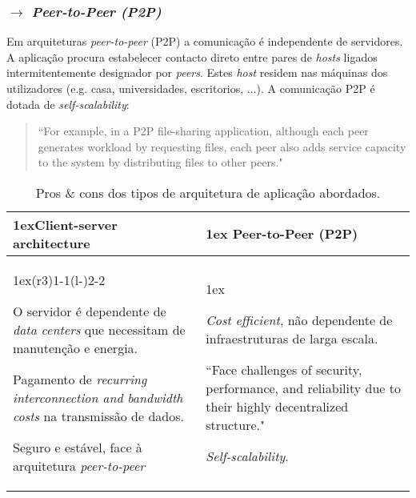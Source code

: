 \subsubsection[2.1.2 Peer-to-Peer (P2P)]{$\pmb{\rightarrow}$ \textit{Peer-to-Peer (P2P)}}

Em arquiteturas \textit{peer-to-peer} (P2P) a comunicação é independente de servidores. A aplicação procura estabelecer contacto direto entre pares de \textit{hosts} ligados intermitentemente designador por \textit{peers}. Estes \textit{host} residem nas máquinas dos utilizadores (e.g. casa, universidades, escritorios, ...). A comunicação P2P é dotada de \textit{self-scalability}:

\begin{quote}
    ``For example, in a P2P file-sharing application, although each peer generates workload by requesting files, each peer also adds service capacity to the system by distributing files to other peers."\cite{Kurose2017}
\end{quote}

\vspace{-0.5 em}
\begin{table}[H]
    \begin{tabularx}{\linewidth}{>{\parskip1ex}X@{\kern4\tabcolsep}>{\parskip1ex}X}
    \toprule
    \hfil\bfseries Client-server architecture
    &
    \hfil\bfseries Peer-to-Peer (P2P) 
    \\\cmidrule(r{3\tabcolsep}){1-1}\cmidrule(l{-\tabcolsep}){2-2}
    
    O servidor é dependente de \textit{data centers} que necessitam de manutenção e energia.\par
    Pagamento de \textit{recurring interconnection and bandwidth costs} na transmissão de dados.\par
    Seguro e estável, face à arquitetura \textit{peer-to-peer}
    &
    
    \textit{Cost efficient}, não dependente de infraestruturas de larga escala.\par
    ``Face challenges of security, performance, and reliability due to their highly
    decentralized structure."\par
    \textit{Self-scalability}.
    \\\bottomrule
    \end{tabularx}
    \caption{Pros \& cons dos tipos de arquitetura de aplicação abordados.}
\end{table}
